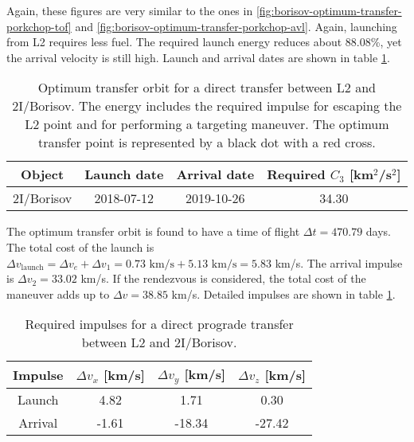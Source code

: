 Again, these figures are very similar to the ones in
\ref{fig:borisov-optimum-transfer-porkchop-tof} and
\ref{fig:borisov-optimum-transfer-porkchop-avl}. Again, launching from L2
requires less fuel. The required launch energy reduces about 88.08\%, yet the
arrival velocity is still high. Launch and arrival dates are shown in table
\ref{tab:l2-borisov-direct-transfer-optimum}.

\vspace{1cm}
\begin{table}[H]
  \centering
  \begin{tabular}{|c|c|c|c|}
    \hline
    Object     & Launch date & Arrival date & Required $C_3$ [km$^2$/s$^2$] \\
    \hline
    2I/Borisov & 2018-07-12  & 2019-10-26   & 34.30                         \\
    \hline
  \end{tabular}
  \caption[Optimum transfer orbit for a direct transfer between L2 and
    2I/Borisov.]{Optimum transfer orbit for a direct transfer between
    L2 and 2I/Borisov. The energy includes the required impulse for
    escaping the L2 point and for performing a targeting maneuver. The optimum transfer point is represented by a black dot
        with a red cross.
}
  \label{tab:l2-borisov-direct-transfer-optimum}
\end{table}

The optimum transfer orbit is found to have a time of flight $\Delta t = 470.79$
days. The total cost of the launch is $\Delta v_\text{launch} = \Delta v_e +
  \Delta v_1 = 0.73 \text{ km/s} + 5.13 \text{ km/s} = 5.83$ km/s. The arrival
impulse is $\Delta v_2 = 33.02$ km/s. If the rendezvous is considered, the total
cost of the maneuver adds up to $\Delta v = 38.85$ km/s. Detailed impulses are
shown in table \ref{tab:l2-borisov-direct-transfer-optimum}.

\vspace{1cm}
\begin{table}[H]
  \centering
  \begin{tabular}{|c|c|c|c|}
    \hline
    Impulse & $\Delta v_x$ [km/s] & $\Delta v_y$ [km/s] & $\Delta v_z$ [km/s] \\
    \hline
    Launch  & 4.82                & 1.71                & 0.30                \\
    \hline
    Arrival & -1.61               & -18.34              & -27.42              \\
    \hline
  \end{tabular}
  \caption[Required impulses for a direct prograde transfer between L2 and
    2I/Borisov]{Required impulses for a direct prograde transfer between L2 and
    2I/Borisov.}
  \label{tab:l2-borisov-direct-transfer-impulses}
\end{table}

